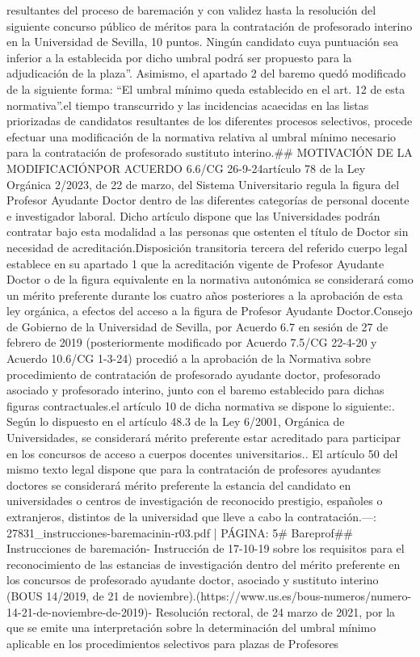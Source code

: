 \documentclass{article}
\begin{document}
\begin{itemize}
{{{{resultantes del proceso de baremación y con validez hasta la resolución del siguiente concurso público de méritos para la contratación de profesorado interino en la Universidad de Sevilla, 10 puntos. Ningún candidato cuya puntuación sea inferior a la establecida por dicho umbral podrá ser propuesto para la adjudicación de la plaza”. Asimismo, el apartado 2 del baremo quedó modificado de la siguiente forma: “El umbral mínimo queda establecido en el art. 12 de esta normativa”.\n\nDado el tiempo transcurrido y las incidencias acaecidas en las listas priorizadas de candidatos resultantes de los diferentes procesos selectivos, procede efectuar una modificación de la normativa relativa al umbral mínimo necesario para la contratación de profesorado sustituto interino.\n\n## MOTIVACIÓN DE LA MODIFICACIÓN\n\nAPROBADA POR ACUERDO 6.6/CG 26-9-24\n\nEl artículo 78 de la Ley Orgánica 2/2023, de 22 de marzo, del Sistema Universitario regula la figura del Profesor Ayudante Doctor dentro de las diferentes categorías de personal docente e investigador laboral. Dicho artículo dispone que las Universidades podrán contratar bajo esta modalidad a las personas que ostenten el título de Doctor sin necesidad de acreditación.\n\nLa Disposición transitoria tercera del referido cuerpo legal establece en su apartado 1 que la acreditación vigente de Profesor Ayudante Doctor o de la figura equivalente en la normativa autonómica se considerará como un mérito preferente durante los cuatro años posteriores a la aprobación de esta ley orgánica, a efectos del acceso a la figura de Profesor Ayudante Doctor.\n\nEl Consejo de Gobierno de la Universidad de Sevilla, por Acuerdo 6.7 en sesión de 27 de febrero de 2019 (posteriormente modificado por Acuerdo 7.5/CG 22-4-20 y Acuerdo 10.6/CG 1-3-24) procedió a la aprobación de la Normativa sobre procedimiento de contratación de profesorado ayudante doctor, profesorado asociado y profesorado interino, junto con el baremo establecido para dichas figuras contractuales.\n\nEn el artículo 10 de dicha normativa se dispone lo siguiente:\n{}. Según lo dispuesto en el artículo 48.3 de la Ley 6/2001, Orgánica de Universidades, se considerará mérito preferente estar acreditado para participar en los concursos de acceso a cuerpos docentes universitarios.. El artículo 50 del mismo texto legal dispone que para la contratación de profesores ayudantes doctores se considerará mérito preferente la estancia del candidato en universidades o centros de investigación de reconocido prestigio, españoles o extranjeros, distintos de la universidad que lleve a cabo la contratación.\n\n---\n\nFUENTE: 27831_instrucciones-baremacinin-r03.pdf | PÁGINA: 5\n# Bareprof\n\n## Instrucciones de baremación\n\n- Instrucción de 17-10-19 sobre los requisitos para el reconocimiento de las estancias de investigación dentro del mérito preferente en los concursos de profesorado ayudante doctor, asociado y sustituto interino (BOUS 14/2019, de 21 de noviembre).(https://www.us.es/bous-numeros/numero-14-21-de-noviembre-de-2019)\n\n- Resolución rectoral, de 24 marzo de 2021, por la que se emite una interpretación sobre la determinación del umbral mínimo aplicable en los procedimientos selectivos para plazas de Profesores }}}}
\end{itemize}
\end{document}
